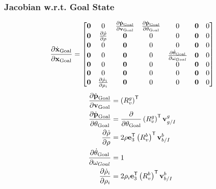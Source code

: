 \subsubsection{Jacobian w.r.t. Goal State}
\begin{equation}
  \frac{\partial \dot{\boldsymbol{\mathrm{x}}}_{\text{Goal}}}{\partial \boldsymbol{\mathrm{x}}_{\text{Goal}}}
  =
  \begin{bmatrix}
    \boldsymbol{\mathrm{0}} & 0 & \frac{\partial \dot{\boldsymbol{\mathrm{p}}}_{\text{Goal}}}{\partial
      \boldsymbol{\mathrm{v}}_{\text{Goal}}} & \frac{\partial
      \dot{\boldsymbol{\mathrm{p}}}_{\text{Goal}}}{\partial \theta_{\text{Goal}}} & 0 & \boldsymbol{\mathrm{0}} & 0 \\
    \boldsymbol{\mathrm{0}} & \frac{\partial \dot{\rho}}{\partial \rho} & \boldsymbol{\mathrm{0}} & 0 & 0
             & \boldsymbol{\mathrm{0}} & 0 \\
    \boldsymbol{\mathrm{0}} & 0 & \boldsymbol{\mathrm{0}} & 0 & 0 & \boldsymbol{\mathrm{0}} & 0 \\
    \boldsymbol{\mathrm{0}} & 0 & \boldsymbol{\mathrm{0}} & 0 & \frac{\partial
      \dot{\theta}_{\text{Goal}}}{\partial \omega_{Goal}} & \boldsymbol{\mathrm{0}} & 0 \\
    \boldsymbol{\mathrm{0}} & 0 & \boldsymbol{\mathrm{0}} & 0 & 0 & \boldsymbol{\mathrm{0}} & 0 \\
    \boldsymbol{\mathrm{0}} & 0 & \boldsymbol{\mathrm{0}} & 0 & 0 & \boldsymbol{\mathrm{0}} & 0 \\
    \boldsymbol{\mathrm{0}} & \frac{\partial \dot{\rho}_i}{\partial \rho_i} & \boldsymbol{\mathrm{0}} & 0 & 0 & \boldsymbol{\mathrm{0}} & 0
  \end{bmatrix}
\end{equation}
\begin{align}
    \frac{\partial \dot{\boldsymbol{\mathrm{p}}}_{\text{Goal}}}{\partial
      \boldsymbol{\mathrm{v}}_{\text{Goal}}}
      &=
      \left(R_{v}^{g}\right)^{\mathsf{T}}
      \\
    \frac{\partial \dot{\boldsymbol{\mathrm{p}}}_{\text{Goal}}}{\partial \theta_{\text{Goal}}}
      &=
      \frac{\partial}{\partial \theta_{\text{Goal}}} \left(R_{v}^{g}\right)^{\mathsf{T}} \boldsymbol{\mathrm{v}}_{g/I}^{g}
      \\
    \frac{\partial \dot{\rho}}{\partial \rho}
      &=
      2 \rho \boldsymbol{\mathrm{e}}_{3}^{\mathsf{T}} \left(R_{v}^{b}\right)^{\mathsf{T}} \boldsymbol{\mathrm{v}}_{b/I}^{b}
      \\
    \frac{\partial \dot{\theta}_{\text{Goal}}}{\partial \omega_{Goal}}
      &=
      1
      \\
    \frac{\partial \dot{\rho}_i}{\partial \rho_i}
      &=
      2 \rho_i \boldsymbol{\mathrm{e}}_{3}^{\mathsf{T}} \left(R_{v}^{b}\right)^{\mathsf{T}} \boldsymbol{\mathrm{v}}_{b/I}^{b}
\end{align}
